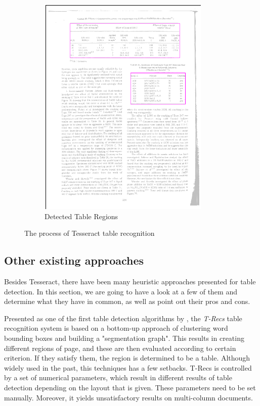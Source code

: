 \begin{figure}[H]
\begin{subfigure}{0.31\textwidth}
\includegraphics[width=\linewidth]{img/tableDetection/tableDetectionResult.pdf}
\caption{Detected Table Regions} \label{fig:1c}
\end{subfigure}

\caption{The process of Tesseract table recognition} \label{fig:1}
\end{figure}

\subsection{Other existing approaches}

Besides Tesseract, there have been many heuristic approaches presented for table detection. In this section, we are going to have a look at a few of them and determine what they have in common, as well as point out their pros and cons.

Presented as one of the first table detection algorithms by \citet{TRecs}, the \emph{T-Recs} table recognition system is based on a bottom-up approach of clustering word bounding boxes and building a "segmentation graph". This results in creating different regions of page, and these are then evaluated according to certain criterion. If they satisfy them, the region is determined to be a table. Although widely used in the past, this techniques has a few setbacks. T-Recs is controlled by a set of numerical parameters, which result in different results of table detection depending on the layout that is given. These parameters need to be set manually. Moreover, it yields unsatisfactory results on multi-column documents.

